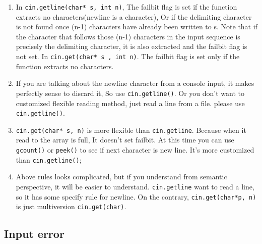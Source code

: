 \documentclass[a4paper,11pt,twoside]{book}
\begin{document}
\begin{itemize}
\begin{enumerate}
		\item In \texttt{cin.getline(char* s, int n)}, The failbit flag is set if the function extracts no characters(newline is a character), Or if the delimiting character is not found once (n-1) characters have already been written to s. Note that if the character that follows those (n-1) characters in the input sequence is precisely the delimiting character, it is also extracted and the failbit flag is not set. In \texttt{cin.get(char* s ,  int n)}. The failbit flag is set only if the function extracts no characters.
		
		\item If you are talking about the newline character from a console input, it makes perfectly sense to discard it, So use \texttt{cin.getline()}. Or you don't want to customized flexible reading method, just read a line from a file. please use \texttt{cin.getline()}.
		
		\item \texttt{cin.get(char* s, n)} is more flexible than \texttt{cin.getline}. Because when it read to the array is full, It doesn't set failbit. At this time you can use \texttt{gcount()} or \texttt{peek()} to see if next character is new line. It's more customized than \texttt{cin.getline()};

		\item Above rules looks complicated, but if you understand from semantic perspective, it will be easier to understand. \texttt{cin.getline} want to read a line, so it has some specify rule for newline.  On the contrary, \texttt{cin.get(char*p, n)} is just multiversion \texttt{cin.get(char)}. 
	\end{enumerate}
	
\end{itemize}

\subsection{Input error}
\end{document}
